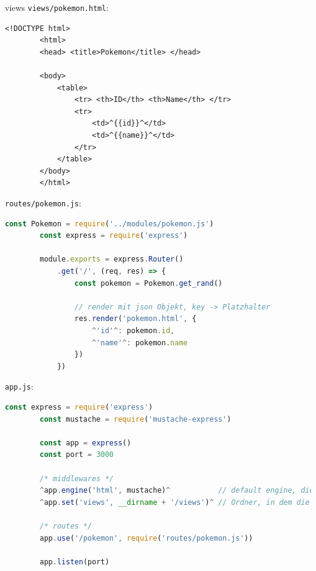 \begin{example}{views}
    \texttt{views/pokemon.html}:
    \begin{lstlisting}[language=HTML5]
        <!DOCTYPE html>
        <html>
        <head> <title>Pokemon</title> </head>

        <body>
            <table>
                <tr> <th>ID</th> <th>Name</th> </tr>
                <tr>
                    <td>^{{id}}^</td>
                    <td>^{{name}}^</td>
                </tr>
            </table>
        </body>
        </html>
    \end{lstlisting}

    \texttt{routes/pokemon.js}:
    \begin{lstlisting}[language=JavaScript]
        const Pokemon = require('../modules/pokemon.js')
        const express = require('express')
        
        module.exports = express.Router()
            .get('/', (req, res) => {
                const pokemon = Pokemon.get_rand()

                // render mit json Objekt, key -> Platzhalter
                res.render('pokemon.html', {
                    ^'id'^: pokemon.id,
                    ^'name'^: pokemon.name 
                })
            })
    \end{lstlisting}

    \texttt{app.js}:
    \begin{lstlisting}[language=JavaScript]
        const express = require('express')
        const mustache = require('mustache-express')

        const app = express()
        const port = 3000

        /* middlewares */
        ^app.engine('html', mustache)^           // default engine, die von res.render() genutzt wird
        ^app.set('views', __dirname + '/views')^ // Ordner, in dem die engine nach html Dateien sucht

        /* routes */
        app.use('/pokemon', require('routes/pokemon.js'))
        
        app.listen(port)
    \end{lstlisting}
\end{example}